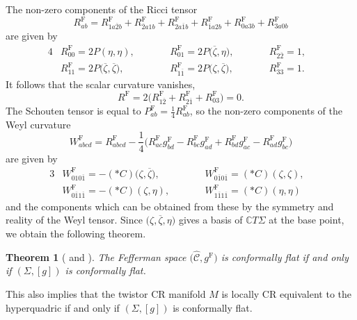 \documentclass[11pt]{article}
\numberwithin{equation}{section}
\newcommand\ol{\overline}
\newcommand{\wh}{\widehat}
\numberwithin{equation}{section}
\newtheorem{Theorem}{Theorem}[section]
\begin{document}
The non-zero components of the Ricci tensor
\[
R^{\mathrm{F}}_{ab}=R^{\mathrm{F}}_{1a\ol2b}+R^{\mathrm{F}}_{\ol2a1b}+R^{\mathrm{F}}_{2a\ol1b}+R^{\mathrm{F}}_{\ol1a2b}+R^{\mathrm{F}}_{0a3b}+R^{\mathrm{F}}_{3a0b}
\]
are given by
\begin{alignat*}{4}
&R^{\mathrm{F}}_{00}=2P(\eta, \eta), \qquad&&
R^{\mathrm{F}}_{01}=2P\bigl(\ol\zeta, \eta\bigr), \qquad&&
R^{\mathrm{F}}_{2\ol2}=1,& \\
&R^{\mathrm{F}}_{11}=2P\bigl(\ol\zeta, \ol\zeta\bigr),\qquad&&
R^{\mathrm{F}}_{1\ol1}=2P\bigl(\zeta, \ol\zeta\bigr),\qquad&&
R^{\mathrm{F}}_{33}=1.&
\end{alignat*}
It follows that the scalar curvature vanishes,
\[
R^{\mathrm{F}}=2\bigl(R^{\mathrm{F}}_{1\ol2}+R^{\mathrm{F}}_{2\ol1}+R^{\mathrm{F}}_{03}\bigr)=0.
\]
The Schouten tensor is equal to $P^{\mathrm{F}}_{ab}=\frac{1}{4}R^{\mathrm{F}}_{ab}$, so the non-zero components of the Weyl curvature
\[
W^{\mathrm{F}}_{abcd}=R^{\mathrm{F}}_{abcd}-\frac{1}{4}
\bigl(R^{\mathrm{F}}_{ac}g^{\mathrm{F}}_{bd}-R^{\mathrm{F}}_{bc}g^{\mathrm{F}}_{ad}+R^{\mathrm{F}}_{bd}g^{\mathrm{F}}_{ac}-R^{\mathrm{F}}_{ad}g^{\mathrm{F}}_{bc}\bigr)
\]
are given by
\begin{alignat*}{3}
&W^{\mathrm{F}}_{010\ol1}=-(*C)\bigl(\zeta, \ol\zeta\bigr),\qquad&&
W^{\mathrm{F}}_{0\ol10\ol1}=(*C)(\zeta, \zeta),& \\
&W^{\mathrm{F}}_{0\ol11\ol1}=-(*C)(\zeta, \eta),\qquad&&
W^{\mathrm{F}}_{1\ol11\ol1}=(*C)(\eta, \eta)&
\end{alignat*}
and the components which can be obtained from these by the symmetry and reality of the Weyl tensor.
Since $\bigl(\zeta, \ol\zeta, \eta\bigr)$ gives a basis of $\mathbb{C}T\Sigma$ at the base point, we obtain the following theorem.

\begin{Theorem}[{\cite[Theorem 6.7]{Low}} and \cite{SY}]\label{flat}
The Fefferman space $\bigl(\wh{\mathcal{C}}, g^{\mathrm{F}}\bigr)$ is conformally flat if and only if $(\Sigma, [g])$ is conformally flat.
\end{Theorem}

This also implies that the twistor CR manifold $M$ is locally CR equivalent to the hyperquadric if and only if $(\Sigma, [g])$ is conformally flat.
\end{document}
